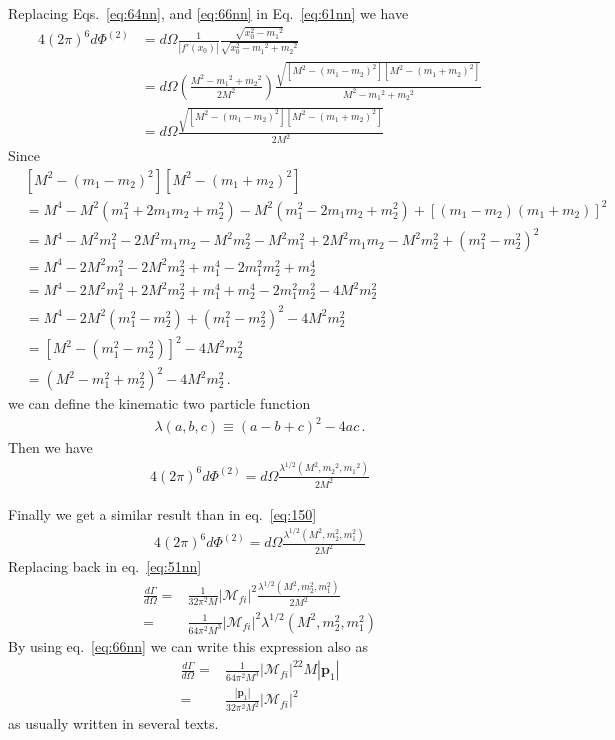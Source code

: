 Replacing Eqs.~\eqref{eq:64nn}, and \eqref{eq:66nn} in Eq.~\eqref{eq:61nn}
we have
\begin{align}
  \label{eq:67nn}
4(2\pi)^6d\Phi^{(2)}&=d\Omega\frac{1}{|f'(x_0)|}
\frac{\sqrt{x_0^2-{m_1}^2}}{\sqrt{x_0^2-{m_1}^2+{m_2}^2}}\nonumber\\
  &=d\Omega\left(\frac{M^2-{m_1}^2+{m_2}^2}{2M^2}\right)
\frac{\sqrt{[M^2-({m_1}-{m_2})^2][M^2-({m_1}+{m_2})^2]}}{M^2-{m_1}^2+{m_2}^2}\nonumber\\
&=d\Omega\frac{\sqrt{[M^2-({m_1}-{m_2})^2][M^2-({m_1}+{m_2})^2]}}{2M^2}
\end{align}
Since
\begin{align}
&\left[ M^2-\left( m_1-m_2 \right)^2 \right]\left[ M^2-\left( m_1+m_2 \right)^2 \right] \nonumber\\
&=  M^4-M^2 \left( m_1^2+2m_1m_2+m_2^2 \right)-M^2 \left( m_1^2-2m_1m_2+m_2^2 \right) +\left[ \left( m_1-m_2 \right)\left( m_1+m_2 \right) \right]^2 \nonumber\\
&=  M^4-M^2m_1^2-2M^2m_1m_2-M^2m_2^2-M^2m_1^2+2M^2m_1m_2-M^2m_2^2+\left( m_1^2-m_2^2 \right)^2 \nonumber\\
&=  M^4-2M^2m_1^2-2M^2m_2^2+m_1^4-2m_1^2m_2^2+m_2^4 \nonumber\\
&=  M^4 -2M^2m_1^2+2M^2m_2^2+m_1^4+m_2^4-2m_1^2m_2^2 -4M^2m_2^2 \nonumber\\
&=  M^4 -2M^2 \left( m_1^2-m_2^2 \right)+\left( m_1^2-m_2^2 \right)^2 -4M^2m_2^2 \nonumber\\
&=  \left[ M^2 -\left( m_1^2-m_2^2 \right) \right]^2-4M^2m_2^2 \nonumber\\
&=  \left( M^2 -m_1^2+m_2^2 \right)^2-4M^2m_2^2\,.
\end{align}
we can define the kinematic two particle function
\begin{align}
  \label{eq:46}
 \lambda(a,b,c)\equiv( a-b+c)^2-4ac\,.
\end{align}
Then we have
\begin{align}
\label{eq:150nn}
4(2\pi)^6d\Phi^{(2)}=d\Omega\frac{\lambda^{1/2}(M^2,{m_2}^2,{m_1}^2)}{2M^2}
\end{align}


Finally  we get a similar result than in eq.~\eqref{eq:150}
\begin{align}
    4(2\pi)^6d\Phi^{(2)}=d\Omega\frac{\lambda^{1/2}(M^2,m_2^2,m_1^2)}{2M^2}
\end{align}
Replacing back in eq.~\eqref{eq:51nn}
\begin{align}
\label{eq:152}
\frac{d\Gamma}{d\Omega}=&\frac{1}{32 \pi^2M}\left|\mathcal{M}_{fi}\right|^2\frac{\lambda^{1/2}(M^2,m_2^2,m_1^2)}{2M^2}\nonumber\\
=&\frac{1}{64 \pi^2M^3}\left|\mathcal{M}_{fi}\right|^2\lambda^{1/2}(M^2,m_2^2,m_1^2) 
\end{align}
By using eq.~\eqref{eq:66nn} we can write this expression also as
\begin{align}
\frac{d\Gamma}{d\Omega}
=&\frac{1}{64 \pi^2M^3}\left|\mathcal{M}_{fi}\right|^22M|\mathbf{p}_1|\nonumber\\
=&\frac{|\mathbf{p}_1|}{32 \pi^2M^2}\left|\mathcal{M}_{fi}\right|^2
\end{align}
as usually written in several texts.

